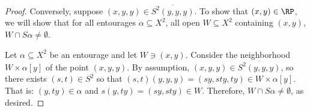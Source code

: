 \begin{proof}
    Conversely, suppose $(x,y,y) \in \overline{S^2 (y,y,y)}$. To show that $(x,y) \in \RP$, we will show that for all entourages $\alpha \subseteq X^2$, all open $W \subseteq X^2$ containing $(x,y)$, $W \cap S \alpha \neq \emptyset$.
    
    Let $\alpha \subseteq X^2$ be an entourage and let $W \ni (x,y)$. Consider the neighborhood $W \times \alpha[y]$ of the point $(x,y,y)$.   By assumption, $(x,y,y) \in \overline{S^2 (y,y,y)}$, so there exists $(s,t) \in S^2$ so that $(s,t)(y,y,y) = (sy,sty,ty) \in W \times \alpha[y]$. That is: $(y,ty) \in \alpha$ and $s(y,ty) = (sy,sty) \in W$.  Therefore, $W \cap S \alpha \neq \emptyset$, as desired.
\end{proof}


    
    

